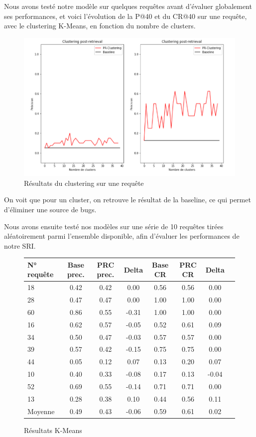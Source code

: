 \documentclass{article}
\begin{document}
Nous avons testé notre modèle sur quelques requêtes avant d'évaluer globalement ses performances, et voici l'évolution de la P@40 et du CR@40 sur une requête, avec le clustering K-Means, en fonction du nombre de clusters.

\begin{figure}[H]
\includegraphics[scale=0.4]{img/qry11.png}
\caption{Résultats du clustering sur une requête}
\end{figure}

On voit que pour un cluster, on retrouve le résultat de la baseline, ce qui permet d'éliminer une source de bugs. 

Nous avons ensuite testé nos modèles sur une série de 10 requêtes tirées aléatoirement parmi l'ensemble disponible, afin d'évaluer les performances de notre SRI.

\begin{figure}[H]
\begin{tabular}{l*{6}{c}r}
N° requête & Base prec. & PRC prec. & Delta  & Base CR & PRC CR & Delta\\ 
\hline
   18 &    0.42   &   0.42   &   0.00 &  0.56  & 0.56  &   0.00 \\
   28 &    0.47   &   0.47   &   0.00 &  1.00  & 1.00  &   0.00 \\
   60 &    0.86   &   0.55   &  -0.31 &  1.00  & 1.00  &   0.00 \\
   16 &    0.62   &   0.57   &  -0.05 &  0.52  & 0.61  &   0.09 \\
   34 &    0.50   &   0.47   &  -0.03 &  0.57  & 0.57  &   0.00 \\
   39 &    0.57   &   0.42   &  -0.15 &  0.75  & 0.75  &   0.00 \\
   44 &    0.05   &   0.12   &   0.07 &  0.13  & 0.20  &   0.07 \\
   10 &    0.40   &   0.33   &  -0.08 &  0.17  & 0.13  &  -0.04 \\
   52 &    0.69   &   0.55   &  -0.14 &  0.71  & 0.71  &   0.00 \\
   13 &    0.28   &   0.38   &   0.10 &  0.44  & 0.56  &   0.11 \\
\hline
Moyenne  &    0.49   &   0.43   &  -0.06 &  0.59  & 0.61  &   0.02 \\
\end{tabular}
\caption{Résultats K-Means}
\end{figure}
\end{document}
